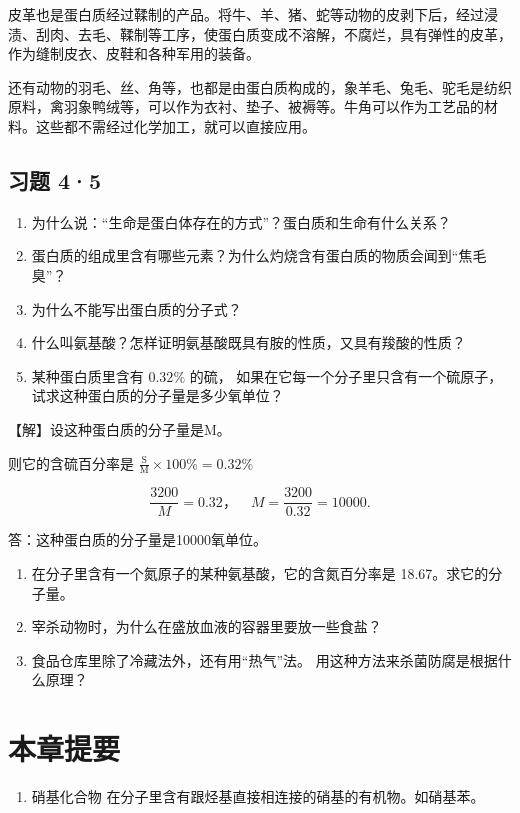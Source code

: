 皮革也是蛋白质经过鞣制的产品。将牛、羊、猪、蛇等动物的皮剥下后，经过浸渍、刮肉、去毛、鞣制等工序，使蛋白质变成不溶解，不腐烂，具有弹性的皮革，作为缝制皮衣、皮鞋和各种军用的装备。

还有动物的羽毛、丝、角等，也都是由蛋白质构成的，象羊毛、兔毛、驼毛是纺织原料，禽羽象鸭绒等，可以作为衣衬、垫子、被褥等。牛角可以作为工艺品的材料。这些都不需经过化学加工，就可以直接应用。

\subsection{习题 4·5}

\begin{enumerate}
\item
  为什么说：``生命是蛋白体存在的方式''？蛋白质和生命有什么关系？
\item
  蛋白质的组成里含有哪些元素？为什么灼烧含有蛋白质的物质会闻到``焦毛臭''？
\item
  为什么不能写出蛋白质的分子式？
\item
  什么叫氨基酸？怎样证明氨基酸既具有胺的性质，又具有羧酸的性质？
\item
  某种蛋白质里含有 \(0.32\%\) 的硫，
  如果在它每一个分子里只含有一个硫原子，
  试求这种蛋白质的分子量是多少氧单位？
\end{enumerate}

【解】设这种蛋白质的分子量是M。

则它的含硫百分率是
\(\frac{\mathrm{S}}{\mathrm{M}} \times 100\% = 0.32\%\)

\[
\frac {3200}{M} = 0.32\text{，} \quad M = \frac {3200}{0.32} = 10000.
\]

答：这种蛋白质的分子量是10000氧单位。

\begin{enumerate}[start=6]
\item
  在分子里含有一个氮原子的某种氨基酸，它的含氮百分率是
  18.67。求它的分子量。
\item
  宰杀动物时，为什么在盛放血液的容器里要放一些食盐？
\item
  食品仓库里除了冷藏法外，还有用``热气''法。
  用这种方法来杀菌防腐是根据什么原理？
\end{enumerate}

\section{本章提要}

\begin{enumerate}
\item
  硝基化合物 在分子里含有跟烃基直接相连接的硝基的有机物。如硝基苯。
\end{enumerate}

